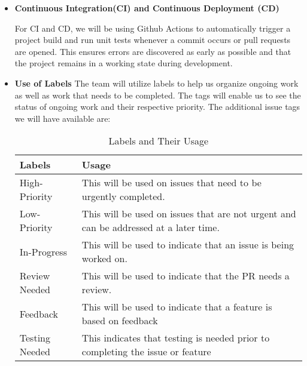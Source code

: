 \documentclass{article}
\begin{document}
\begin{itemize}
	\item\textbf{Continuous Integration(CI) and Continuous Deployment (CD)}
	
  For CI and CD, we will be using Github Actions to automatically trigger a project build and run unit tests 
  whenever a commit occurs or pull requests are opened. This ensures errors are discovered as early as possible 
  and that the project remains in a working state during development. 

  \item \textbf{Use of Labels} \newline
  The team will utilize labels to help us organize ongoing work as well as work that needs to be completed. The tags will enable us to see the status of ongoing work and their respective priority. 
    The additional issue tags we will have available are:

    \begin{table}[!htbp]
      \centering
      \caption{Labels and Their Usage}
      \begin{tabular}{|p{4cm}|p{4cm}|}
      \hline
      \textbf{Labels} & \textbf{Usage} \\
      \hline
      High-Priority & This will be used on issues that need to be urgently completed.\\
      \hline
      Low-Priority & This will be used on issues that are not urgent and can be addressed at a later time.\\
      \hline
      In-Progress & This will be used to indicate that an issue is being worked on.\\
      \hline 
      Review Needed & This will be used to indicate that the PR needs a review.\\
      \hline
      Feedback & This will be used to indicate that a feature is based on feedback \\ 
      \hline
      Testing Needed & This indicates that testing is needed prior to completing the issue or feature\\
      \hline
      \end{tabular}
    \end{table}


\end{itemize}
\end{document}
